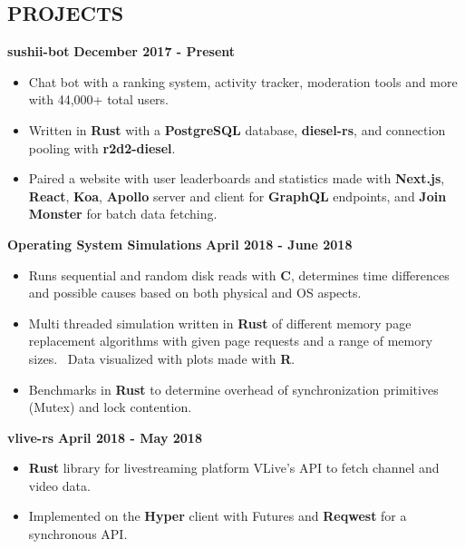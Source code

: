 \documentclass{res}
\begin{document}
\begin{resume}
		\section{PROJECTS}
		\vspace{6pt}

		{\bf sushii-bot} \hfill {\bf December 2017 - Present} \\
			\vspace{-3.5mm}
			\begin{itemize} \itemsep -2pt
				\item Chat bot with a ranking system, activity tracker, moderation tools and more with 44,000+ total users.
				\item Written in {\bf Rust} with a {\bf PostgreSQL} database, {\bf diesel-rs}, and connection pooling with {\bf r2d2-diesel}.
				\item Paired a website with user leaderboards and statistics made with {\bf Next.js}, {\bf React}, {\bf Koa}, {\bf Apollo} server and client for {\bf GraphQL} endpoints,
					and {\bf Join Monster} for batch data fetching.
			\end{itemize}
		{\bf Operating System Simulations} \hfill {\bf April 2018 - June 2018} \\
			\vspace{-3.5mm}
			\begin{itemize} \itemsep -2pt
				\item Runs sequential and random disk reads with {\bf C}, determines time differences and possible causes based on both physical and OS aspects.
				\item Multi threaded simulation written in {\bf Rust} of different memory page replacement algorithms with given page requests and a range of memory sizes. \
				Data visualized with plots made with {\bf R}.
				\item Benchmarks in {\bf Rust} to determine overhead of synchronization primitives (Mutex) and lock contention.
			\end{itemize}
		{\bf vlive-rs} \hfill {\bf April 2018 - May 2018} \\
			\vspace{-3.5mm}
			\begin{itemize} \itemsep -2pt
				\item {\bf Rust} library for livestreaming platform VLive's API to fetch channel and video data.
				\item Implemented on the {\bf Hyper} client with Futures and {\bf Reqwest} for a synchronous API.
			\end{itemize}
	\end{resume} 
\end{document}
